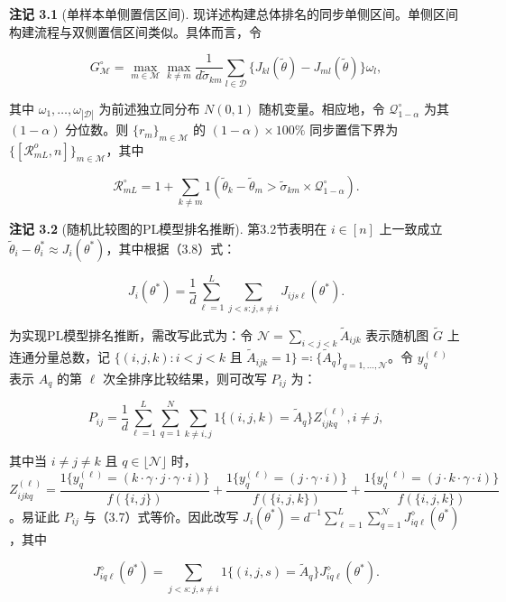 \textbf{注记 3.1} (单样本单侧置信区间). 现详述构建总体排名的同步单侧区间。单侧区间构建流程与双侧置信区间类似。具体而言，令

\[
G_{\mathcal{M}}^{\circ} = \max_{m\in \mathcal{M}}\max_{k\neq m}\frac{1}{d\widetilde{\sigma}_{km}}\sum_{l\in \mathcal{D}}\{J_{kl}(\widetilde{\theta}) - J_{ml}(\widetilde{\theta})\} \omega_{l}, \tag{3.16}
\]

其中 $\omega_{1},\ldots ,\omega_{|\mathcal{D}|}$ 为前述独立同分布 $N(0,1)$ 随机变量。相应地，令 $\mathcal{Q}_{1 - \alpha}^{\circ}$ 为其 $(1 - \alpha)$ 分位数。则 $\{r_{m}\}_{m\in \mathcal{M}}$ 的 $(1 - \alpha)\times 100\%$ 同步置信下界为 $\{[\mathcal{R}_{mL}^{o},n]\}_{m\in \mathcal{M}}$，其中

\[
\mathcal{R}_{mL}^{\circ} = 1 + \sum_{k\neq m}1\left(\widetilde{\theta}_{k} - \widetilde{\theta}_{m} > \widetilde{\sigma}_{km}\times \mathcal{Q}_{1 - \alpha}^{\circ}\right). \tag{3.17}
\]

\textbf{注记 3.2} (随机比较图的PL模型排名推断). 第3.2节表明在 $i \in [n]$ 上一致成立 $\widetilde{\theta}_{i} - \theta_{i}^{*} \approx J_{i}(\theta^{*})$，其中根据（3.8）式：

$$
J_{i}(\theta^{*}) = \frac{1}{d} \sum_{\ell = 1}^{L} \sum_{j < s:j, s \neq i} J_{ijs\ell}(\theta^{*}).
$$

为实现PL模型排名推断，需改写此式为：令 $\mathcal{N} = \sum_{i< j< k}\widetilde{A}_{i j k}$ 表示随机图 $\widetilde{G}$ 上连通分量总数，记 $\{(i,j,k):i< j< k$ 且 $\widetilde{A}_{i j k} = 1\} \eqqcolon \{\widetilde{A}_{q}\}_{q = 1,\ldots ,\mathcal{N}}$。令 $y_{q}^{(\ell)}$ 表示 $A_{q}$ 的第 $\ell$ 次全排序比较结果，则可改写 $P_{ij}$ 为：

$$
P_{ij} = \frac{1}{d} \sum_{\ell = 1}^{L} \sum_{q = 1}^{N} \sum_{k \neq i, j} 1\{(i,j,k) = \widetilde{A}_{q}\} Z_{ijkq}^{(\ell)}, i \neq j,
$$

其中当 $i\neq j\neq k$ 且 $q\in \lfloor \mathcal{N}\rfloor$ 时，$Z_{i j k q}^{(\ell)} = \dfrac{1\{y_{q}^{(\ell)} = (k\cdot \gamma \cdot j\cdot \gamma \cdot i)\}}{f(\{i,j\})} + \dfrac{1\{y_{q}^{(\ell)} = (j\cdot \gamma \cdot i)\}}{f(\{i,j,k\})} + \dfrac{1\{y_{q}^{(\ell)} = (j\cdot k\cdot \gamma \cdot i)\}}{f(\{i,j,k\})}$。易证此 $P_{ij}$ 与（3.7）式等价。因此改写 $J_{i}(\theta^{*}) = d^{- 1}\sum_{\ell = 1}^{L}\sum_{q = 1}^{\mathcal{N}}J_{i q\ell}^{\diamond}(\theta^{*})$，其中

\[
J_{iq\ell}^{\diamond}(\theta^{*}) = \sum_{j < s:j, s \neq i} 1\{(i,j,s) = \widetilde{A}_{q}\} J_{iq\ell}^{\diamond}(\theta^{*}). \tag{3.18}
\]

